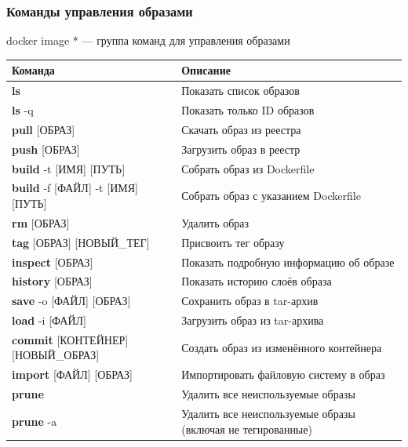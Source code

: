 \documentclass[9pt, aspectratio=1610]{beamer}
\begin{document}
\begin{frame}\frametitle{Команды управления образами}
	
	\begin{alertblock}{docker image * ---}
		группа команд для управления образами
	\end{alertblock}
	
	\small
	\begin{tabularx}{\linewidth}{>{\ttfamily}p{4cm}X}
		\textbf{\rmfamily Команда} & \textbf{Описание} \\
		\hline
		\textbf{ls} & Показать список образов \\
		\textbf{ls} -q & Показать только ID образов \\
		\textbf{pull} {[}ОБРАЗ{]} & Скачать образ из реестра \\
		\textbf{push} {[}ОБРАЗ{]} & Загрузить образ в реестр \\
		\textbf{build} -t {[}ИМЯ{]} {[}ПУТЬ{]} & Собрать образ из Dockerfile \\
		\textbf{build} -f {[}ФАЙЛ{]} -t {[}ИМЯ{]} {[}ПУТЬ{]} & Собрать образ с указанием Dockerfile \\
		\textbf{rm} {[}ОБРАЗ{]} & Удалить образ \\
		\textbf{tag} {[}ОБРАЗ{]} {[}НОВЫЙ\_ТЕГ{]} & Присвоить тег образу \\
		\textbf{inspect} {[}ОБРАЗ{]} & Показать подробную информацию об образе \\
		\textbf{history} {[}ОБРАЗ{]} & Показать историю слоёв образа \\
		\textbf{save} -o {[}ФАЙЛ{]} {[}ОБРАЗ{]} & Сохранить образ в tar-архив \\
		\textbf{load} -i {[}ФАЙЛ{]} & Загрузить образ из tar-архива \\
		\textbf{commit} {[}КОНТЕЙНЕР{]} {[}НОВЫЙ\_ОБРАЗ{]} & Создать образ из изменённого контейнера \\
		\textbf{import} {[}ФАЙЛ{]} {[}ОБРАЗ{]} & Импортировать файловую систему в образ \\
		\textbf{prune} & Удалить все неиспользуемые образы \\
		\textbf{prune} -a & Удалить все неиспользуемые образы (включая не тегированные) \\
	\end{tabularx}
	
\end{frame}
\end{document}

